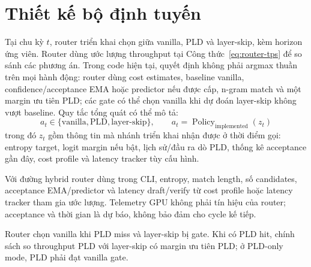 \section{Thiết kế bộ định tuyến}
Tại chu kỳ $t$, router triển khai chọn giữa vanilla, PLD và layer-skip, kèm horizon ứng viên. Router dùng ước lượng throughput tại Công thức~\eqref{eq:router-tps} để so sánh các phương án.
Trong code hiện tại, quyết định không phải argmax thuần trên mọi hành động: router dùng cost estimates, baseline vanilla, confidence/acceptance EMA hoặc predictor nếu được cấp, n-gram match và một margin ưu tiên PLD; các gate có thể chọn vanilla khi dự đoán layer-skip không vượt baseline. Quy tắc tổng quát có thể mô tả:
\begin{equation}
    a_t\in\{\mathrm{vanilla},\mathrm{PLD},\mathrm{layer\mbox{-}skip}\},\qquad
    a_t=\operatorname{Policy}_{\mathrm{implemented}}(z_t)
\end{equation}
trong đó $z_t$ gồm thông tin mà nhánh triển khai nhận được ở thời điểm gọi: entropy target, logit margin nếu bật, lịch sử/đầu ra dò PLD, thống kê acceptance gần đây, cost profile và latency tracker tùy cấu hình.

Với đường hybrid router dùng trong CLI, entropy, match length, số candidates, acceptance EMA/predictor và latency draft/verify từ cost profile hoặc latency tracker tham gia ước lượng. Telemetry GPU không phải tín hiệu của router; acceptance và thời gian là dự báo, không bảo đảm cho cycle kế tiếp.

Router chọn vanilla khi PLD miss và layer-skip bị gate. Khi có PLD hit, chính sách so throughput PLD với layer-skip có margin ưu tiên PLD; ở PLD-only mode, PLD phải đạt vanilla gate.
